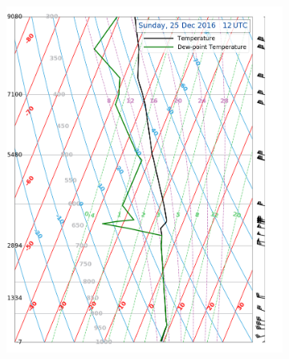 \begin{landscape}
	\begin{figure}\ContinuedFloat
		\centering
		\begin{subfigure}[b]{0.66\textheight}
			\includegraphics[trim={0cm 0.2cm 2.5cm .5cm},clip,
			width=\textwidth]{./fig_Sounding/20161225_12Z}
			\caption{}\label{fig:Soun25}
		\end{subfigure}
		\quad
		\begin{subfigure}[b]{0.66\textheight}

\end{subfigure}
\end{figure}
\end{landscape}
